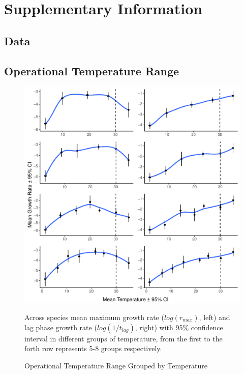 \appendix
\section{Supplementary Information}

\subsection{Data} \label{Data_SI}
\citep{bae2014growth,blagodatskaya2007priming,galarz2016predicting,gill1991growth,heo2009estimation,inoue1977effect,kapetanakou2019model,kirchman1997regulation,koutsoumanis2006development,lee2007model,phillips1987relation,roth1962continuity,silva2018modelling,sivonen1990effects,stannard1985temperature,vankerschaver1996influence,willocx1993modelling,zwietering1994modeling}





\subsection{Operational Temperature Range}

\begin{figure}[htb]
\centering
\includegraphics[width=1\textwidth]{Plot/mean_rate_temp_group.pdf}
\caption{Operational Temperature Range Grouped by Temperature}\label{fig:mean_rate_temp_group}
{\footnotesize Across species mean maximum growth rate ($log(r_{max})$, left) and lag phase growth rate ($log(1/t_{lag})$, right) with 95\% confidence interval in different groups of temperature, from the first to the forth row represents 5-8 groups respectively.}
\end{figure}



